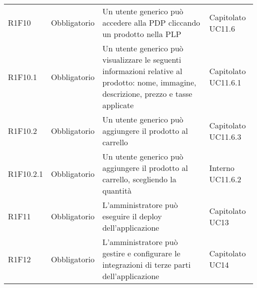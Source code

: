 {\begin{longtable}{C{2.5cm} C{2.8cm} C{6.7cm} C{2.5cm}}

R1F10 & Obbligatorio & Un utente generico può accedere alla PDP cliccando un prodotto nella PLP & Capitolato \newline UC11.6\\
R1F10.1 & Obbligatorio & Un utente generico può visualizzare le seguenti informazioni relative al prodotto: nome, immagine, descrizione, prezzo e tasse applicate & Capitolato \newline UC11.6.1\\
R1F10.2 & Obbligatorio & Un utente generico può aggiungere il prodotto al carrello & Capitolato \newline UC11.6.3\\
R1F10.2.1 & Obbligatorio & Un utente generico può aggiungere il prodotto al carrello, scegliendo la quantità & Interno \newline UC11.6.2 \\


R1F11 & Obbligatorio & L'amministratore può eseguire il deploy dell'applicazione & Capitolato \newline UC13\\
R1F12 & Obbligatorio & L'amministratore può gestire e configurare le integrazioni di terze parti dell'applicazione & Capitolato \newline UC14\\

\end{longtable}

}